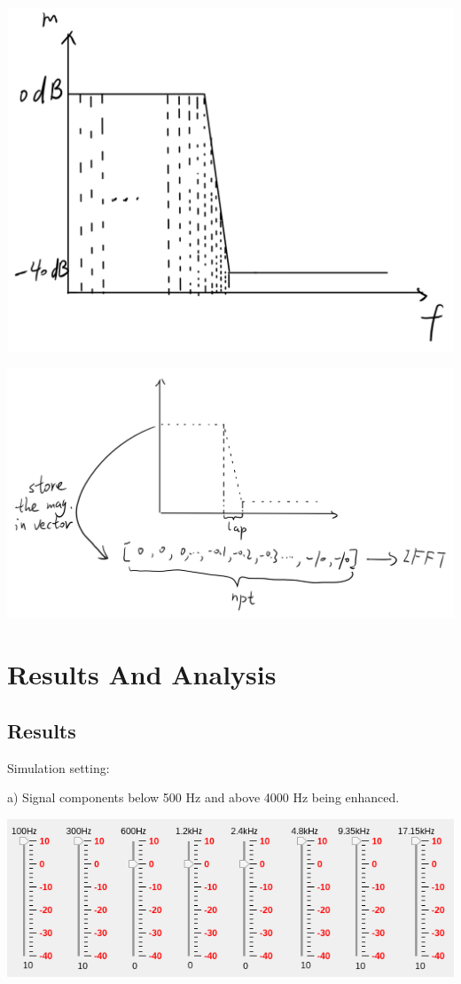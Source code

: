 \documentclass[titlepage]{article}
\begin{document}
\begin{center}
\includegraphics[width=.9\linewidth]{a.png}
\end{center}
\begin{center}
\includegraphics[width=.9\linewidth]{b.png}
\end{center}

\section{Results And Analysis}
\label{sec:orgc7ebd34}
\subsection{Results}
\label{sec:org4248f21}
Simulation setting: 

a) Signal components below 500 Hz and above 4000 Hz being
enhanced.

\begin{center}
\includegraphics[width=.9\linewidth]{setting_a.png}
\end{center}
\end{document}
